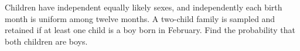 Children have independent equally likely sexes, and independently each birth month is uniform among twelve months. A two-child family is sampled and retained if at least one child is a boy born in February. Find the probability that both children are boys.
